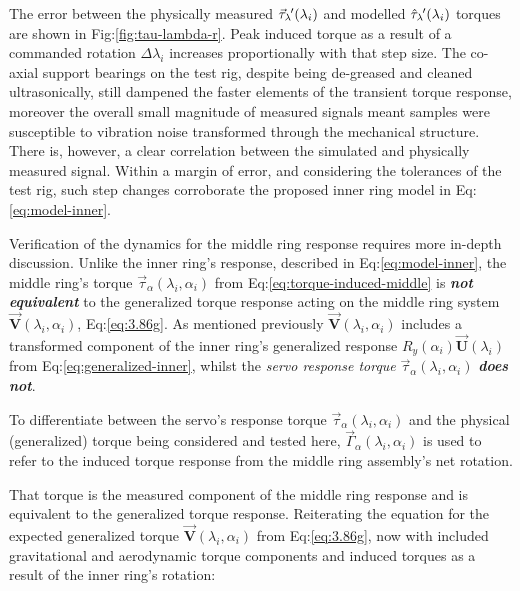 \par
The error between the physically measured $\vec{\tau}_\lambda\hspace{-1pt}'(\lambda_i)$ and modelled $\hat{\tau}_\lambda\hspace{-1pt}'(\lambda_i)$ torques are shown in Fig:\ref{fig:tau-lambda-r}. Peak induced torque as a result of a commanded rotation $\Delta\lambda_i$ increases proportionally with that step size. The co-axial support bearings on the test rig, despite being de-greased and cleaned ultrasonically, still dampened the faster elements of the transient torque response, moreover the overall small magnitude of measured signals meant samples were susceptible to vibration noise transformed through the mechanical structure. There is, however, a clear correlation between the simulated and physically measured signal. Within a margin of error, and considering the tolerances of the test rig, such step changes corroborate the proposed inner ring model in Eq:\ref{eq:model-inner}.
\par
Verification of the dynamics for the middle ring response requires more in-depth discussion. Unlike the inner ring's response, described in Eq:\ref{eq:model-inner}, the middle ring's torque $\vec{\tau}_\alpha(\lambda_i,\alpha_i)$ from Eq:\ref{eq:torque-induced-middle} is \emph{\textbf{not equivalent}} to the generalized torque response acting on the middle ring system $\vec{\mathbf{V}}(\lambda_i,\alpha_i)$, Eq:\ref{eq:3.86g}. As mentioned previously $\vec{\mathbf{V}}(\lambda_i,\alpha_i)$ includes a transformed component of the inner ring's generalized response $R_y(\alpha_i)\vec{\mathbf{U}}(\lambda_i)$ from Eq:\ref{eq:generalized-inner}, whilst the \emph{servo response torque} $\vec{\tau}_\alpha(\lambda_i,\alpha_i)$ \emph{\textbf{does not}}. 
\par
To differentiate between the servo's response torque $\vec{\tau}_\alpha(\lambda_i,\alpha_i)$ and the physical (generalized) torque being considered and tested here, $\vec{\Gamma}_\alpha(\lambda_i,\alpha_i)$ is used to refer to the induced torque response from the middle ring assembly's net rotation. 
\par
That torque is the measured component of the middle ring response and is equivalent to the generalized torque response. Reiterating the equation for the expected generalized torque $\vec{\mathbf{V}}(\lambda_i,\alpha_i)$ from Eq:\ref{eq:3.86g}, now with included gravitational and aerodynamic torque components and induced torques as a result of the inner ring's rotation:
